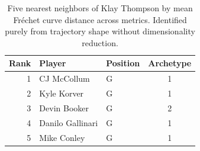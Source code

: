 \begin{table}[htbp]
  \centering\small
  \begin{tabular}{rllc}
    \toprule
    Rank & Player & Position & Archetype \\
    \midrule
    1 & CJ McCollum & G & 1 \\
    2 & Kyle Korver & G & 1 \\
    3 & Devin Booker & G & 2 \\
    4 & Danilo Gallinari & G & 1 \\
    5 & Mike Conley & G & 1 \\
    \bottomrule
  \end{tabular}
  \caption{Five nearest neighbors of Klay Thompson by mean Fr\'{e}chet curve distance across metrics. Identified purely from trajectory shape without dimensionality reduction.}
  \label{tab:Klay_Thompson_frechet_curve_neighbors}
\end{table}

